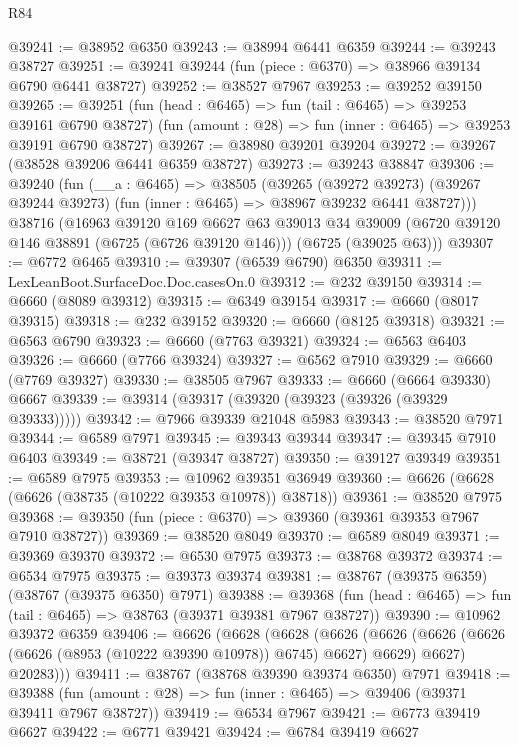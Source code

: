 \begin{lexlean}{R84}
\begin{coremodule}
@39241 := @38952 @6350
@39243 := @38994 @6441 @6359
@39244 := @39243 @38727
@39251 := @39241 @39244 (fun (piece : @6370) => @38966 @39134 @6790 @6441 @38727)
@39252 := @38527 @7967
@39253 := @39252 @39150
@39265 := @39251
    (fun (head : @6465) => fun (tail : @6465) => @39253 @39161 @6790 @38727)
    (fun (amount : @28) => fun (inner : @6465) => @39253 @39191 @6790 @38727)
@39267 := @38980 @39201 @39204
@39272 := @39267 (@38528 @39206 @6441 @6359 @38727)
@39273 := @39243 @38847
@39306 := @39240
    (fun (__a : @6465) =>
    @38505
      (@39265
        (@39272 @39273)
        (@39267 @39244 @39273)
        (fun (inner : @6465) => @38967 @39232 @6441 @38727)))
    @38716
    (@16963
      @39120
      @169
      @6627
      @63
      @39013
      @34
      @39009
      (@6720 @39120 @146 @38891 (@6725 (@6726 @39120 @146)))
      (@6725 (@39025 @63)))
@39307 := @6772 @6465
@39310 := @39307 (@6539 @6790) @6350
@39311 := LexLeanBoot.SurfaceDoc.Doc.casesOn.{0}
@39312 := @232 @39150
@39314 := @6660 (@8089 @39312)
@39315 := @6349 @39154
@39317 := @6660 (@8017 @39315)
@39318 := @232 @39152
@39320 := @6660 (@8125 @39318)
@39321 := @6563 @6790
@39323 := @6660 (@7763 @39321)
@39324 := @6563 @6403
@39326 := @6660 (@7766 @39324)
@39327 := @6562 @7910
@39329 := @6660 (@7769 @39327)
@39330 := @38505 @7967
@39333 := @6660 (@6664 @39330) @6667
@39339 := @39314 (@39317 (@39320 (@39323 (@39326 (@39329 @39333)))))
@39342 := @7966 @39339 @21048 @5983
@39343 := @38520 @7971
@39344 := @6589 @7971
@39345 := @39343 @39344
@39347 := @39345 @7910 @6403
@39349 := @38721 (@39347 @38727)
@39350 := @39127 @39349
@39351 := @6589 @7975
@39353 := @10962 @39351 @36949
@39360 := @6626 (@6628 (@6626 (@38735 (@10222 @39353 @10978)) @38718))
@39361 := @38520 @7975
@39368 := @39350 (fun (piece : @6370) => @39360 (@39361 @39353 @7967 @7910 @38727))
@39369 := @38520 @8049
@39370 := @6589 @8049
@39371 := @39369 @39370
@39372 := @6530 @7975
@39373 := @38768 @39372
@39374 := @6534 @7975
@39375 := @39373 @39374
@39381 := @38767 (@39375 @6359) (@38767 (@39375 @6350) @7971)
@39388 := @39368 (fun (head : @6465) => fun (tail : @6465) => @38763 (@39371 @39381 @7967 @38727))
@39390 := @10962 @39372 @6359
@39406 := @6626
    (@6628
      (@6628
        (@6626
          (@6626 (@6626 (@6626 (@6626 (@8953 (@10222 @39390 @10978)) @6745) @6627) @6629) @6627)
          @20283)))
@39411 := @38767 (@38768 @39390 @39374 @6350) @7971
@39418 := @39388 (fun (amount : @28) => fun (inner : @6465) => @39406 (@39371 @39411 @7967 @38727))
@39419 := @6534 @7967
@39421 := @6773 @39419 @6627
@39422 := @6771 @39421
@39424 := @6784 @39419 @6627

\end{coremodule}
\end{lexlean}
